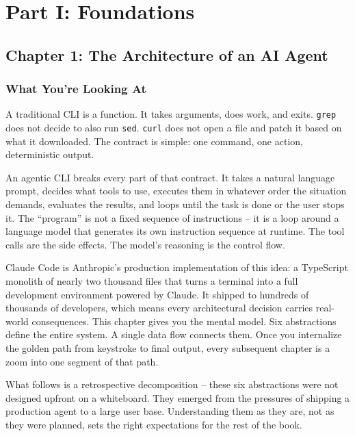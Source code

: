 \documentclass[
  english,
  11pt,
  letterpaper,
]{book}
\begin{document}
\part{Part I: Foundations}

\chapter{Chapter 1: The Architecture of an AI
Agent}\label{chapter-1-the-architecture-of-an-ai-agent}

\section{What You're Looking At}\label{what-youre-looking-at}

A traditional CLI is a function. It takes arguments, does work, and
exits. \texttt{grep} does not decide to also run \texttt{sed}.
\texttt{curl} does not open a file and patch it based on what it
downloaded. The contract is simple: one command, one action,
deterministic output.

An agentic CLI breaks every part of that contract. It takes a natural
language prompt, decides what tools to use, executes them in whatever
order the situation demands, evaluates the results, and loops until the
task is done or the user stops it. The ``program'' is not a fixed
sequence of instructions -- it is a loop around a language model that
generates its own instruction sequence at runtime. The tool calls are
the side effects. The model's reasoning is the control flow.

Claude Code is Anthropic's production implementation of this idea: a
TypeScript monolith of nearly two thousand files that turns a terminal
into a full development environment powered by Claude. It shipped to
hundreds of thousands of developers, which means every architectural
decision carries real-world consequences. This chapter gives you the
mental model. Six abstractions define the entire system. A single data
flow connects them. Once you internalize the golden path from keystroke
to final output, every subsequent chapter is a zoom into one segment of
that path.

What follows is a retrospective decomposition -- these six abstractions
were not designed upfront on a whiteboard. They emerged from the
pressures of shipping a production agent to a large user base.
Understanding them as they are, not as they were planned, sets the right
expectations for the rest of the book.
\end{document}
